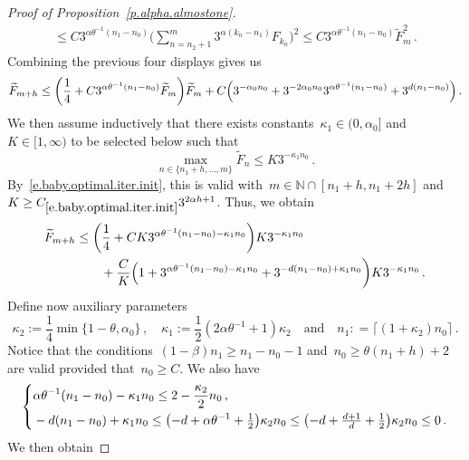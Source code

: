 \documentclass[11pt,twoside]{article} %
\numberwithin{equation}{section}
\theoremstyle{definition}
\let\originalleft\left
\let\originalright\right
\renewcommand{\left}{\mathopen{}\mathclose\bgroup\originalleft}
\renewcommand{\right}{\aftergroup\egroup\originalright}
\newcommand*{\N}{\ensuremath{\mathbb{N}}}
\renewcommand*{\tilde}{\widetilde}
\newcommand{\qand}{\quad \mbox{and} \quad }
\begin{document}
\begin{proof}[{Proof of Proposition~\ref{p.alpha.almostone}}]
\begin{align*}
\leq 
C3^{\alpha \theta^{-1}(n_1-n_0) }\biggl( \sum_{n=n_2+1}^m 3^{\alpha (k_n-n_1)} F_{k_n}\biggr)^2
\leq
C3^{\alpha \theta^{-1}(n_1-n_0) }\tilde{F}_{m}^2
\,.
\end{align*}
Combining the previous four displays gives us
\begin{equation*} 
\tilde{F}_{m+h} \leq \biggl(\frac14   + C 3^{\alpha \theta^{-1} (n_1-n_0)}  \tilde{F}_{m} \biggr) \tilde{F}_{m} +  C \Bigl(3^{-\alpha_0 n_0} + 3^{-2\alpha_0 n_0} 3^{\alpha \theta^{-1} (n_1-n_0)}  + 3^{d(n_1-n_0)} \Bigr)\,.
\end{equation*} 
We then assume inductively that there exists constants~$\kappa_1 \in (0,\alpha_0]$ and~$K \in [1,\infty)$ to be selected below such that
\begin{equation*} 
\max_{n \in \{ n_1+h,\ldots,m\} } \tilde{F}_{n}  
\leq K 3^{-\kappa_1 n_0} 
\,.
\end{equation*}
By~\eqref{e.baby.optimal.iter.init}, this is valid with~$m \in \N \cap [n_1+h, n_1 + 2h]$ and~$K \geq C_{\eqref{e.baby.optimal.iter.init}}3^{2\alpha h +1}$. Thus, we obtain
\begin{align*} 
\tilde{F}_{m+h} & \leq \biggl(\frac14 + C K 3^{\alpha \theta^{-1} (n_1-n_0)- \kappa_1 n_0}  \biggr) K 3^{-\kappa_1 n_0} 
\notag \\ & \qquad 
+ \frac{C}{K}\Bigl( 1 +3^{ \alpha \theta^{-1} (n_1-n_0)-\kappa_1 n_0} + 3^{-d(n_1-n_0)+\kappa_1 n_0} \biggr) K 3^{-\kappa_1 n_0} 
\,.
\end{align*}
Define now auxiliary parameters
\begin{equation*} 
\kappa_2 := \frac14 \min\{ 1-\theta , \alpha_0 \}\,, \quad 
\kappa_1 := \frac12 (2\alpha \theta^{-1} + 1)\kappa_2
\qand
n_1 : =  \bigl\lceil (1+ \kappa_2 ) n_0 \bigr\rceil 
\,.
\end{equation*}
Notice that the conditions~$(1-\beta)n_1 \geq n_1 - n_0-1$ and~$n_0 \geq \theta(n_1+h)+2$ are valid provided that~$n_0 \geq C$. We also have
\begin{equation*} 
\left\{
\begin{aligned}
& \alpha \theta^{-1} (n_1-n_0)- \kappa_1 n_0 \leq 2 - \frac {\kappa_2}{2} n_0 \,,
\\
& 
-d(n_1-n_0)+\kappa_1 n_0 \leq  \bigl(-d + \alpha \theta^{-1} + \tfrac12 \bigr) \kappa_2n_0 
\leq
\bigl(-d + \tfrac{d+1}{d} + \tfrac12 \bigr) \kappa_2n_0 \leq 0
\,.
\end{aligned}
\right.
\end{equation*}
We then obtain

\end{proof}
\end{document}
